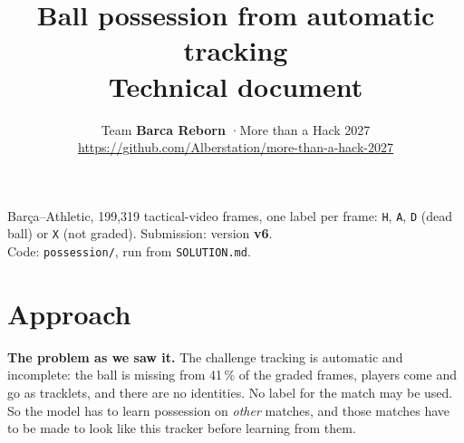 \documentclass[10pt,a4paper]{article}
\title{\textbf{Ball possession from automatic tracking}\\[0.3em]\large Technical document}
\author{Team \textbf{Barca Reborn} \quad·\quad More than a Hack 2027\\
\small\url{https://github.com/Alberstation/more-than-a-hack-2027}}
\date{}
\newcommand{\code}[1]{\texttt{#1}}
\begin{document}
\maketitle
\vspace{-2em}

\begin{center}
Barça--Athletic, 199,319 tactical-video frames, one label per frame: \code{H}, \code{A},
\code{D} (dead ball) or \code{X} (not graded). Submission: version \textbf{v6}.\\
Code: \code{possession/}, run from \code{SOLUTION.md}.
\end{center}

\section{Approach}

\textbf{The problem as we saw it.} The challenge tracking is automatic and incomplete: the ball is
missing from 41\,\% of the graded frames, players come and go as tracklets, and there are no
identities. No label for the match may be used. So the model has to learn possession on
\emph{other} matches, and those matches have to be made to look like this tracker before learning
from them.
\end{document}
